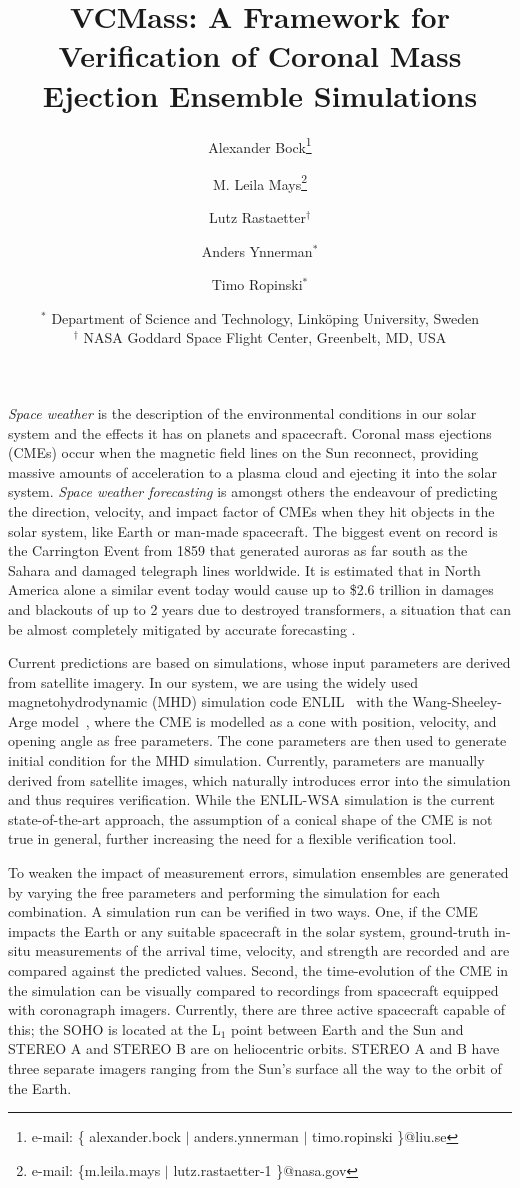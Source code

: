 \documentclass{vgtc}                          %
\title{VCMass: A Framework for Verification of Coronal Mass Ejection Ensemble Simulations}
\author{
Alexander Bock\thanks{e-mail: \{ alexander.bock $\vert$ anders.ynnerman $\vert$ timo.ropinski \}@liu.se}
\and M. Leila Mays\thanks{e-mail: \{m.leila.mays $\vert$ lutz.rastaetter-1 \}@nasa.gov}
\and Lutz Rastaetter$^\dagger$
\and Anders Ynnerman$^*$
\and Timo Ropinski$^*$\\
\and
\scriptsize $^*$ Department of Science and Technology, Link\"oping University, Sweden\\%
\scriptsize $^\dagger$ NASA Goddard Space Flight Center, Greenbelt, MD, USA
}
\begin{document}
\maketitle

\emph{Space weather} is the description of the environmental conditions in our solar system and the effects it has on planets and spacecraft. Coronal mass ejections (CMEs) occur when the magnetic field lines on the Sun reconnect, providing massive amounts of acceleration to a plasma cloud and ejecting it into the solar system. \emph{Space weather forecasting} is amongst others the endeavour of predicting the direction, velocity, and impact factor of CMEs when they hit objects in the solar system, like Earth or man-made spacecraft. The biggest event on record is the Carrington Event from 1859 that generated auroras as far south as the Sahara and damaged telegraph lines worldwide. It is estimated that in North America alone a similar event today would cause up to \$2.6 trillion in damages and blackouts of up to 2 years due to destroyed transformers, a situation that can be almost completely mitigated by accurate forecasting \cite{lloyds2013impact}.

Current predictions are based on simulations, whose input parameters are derived from satellite imagery. In our system, we are using the widely used magnetohydrodynamic (MHD) simulation code ENLIL~\cite{odstrcil2003modeling} with the Wang-Sheeley-Arge model~\cite{parsons2011wang}, where the CME is modelled as a cone with position, velocity, and opening angle as free parameters. The cone parameters are then used to generate initial condition for the MHD simulation. Currently, parameters are manually derived from satellite images, which naturally introduces error into the simulation and thus requires verification. While the ENLIL-WSA simulation is the current state-of-the-art approach, the assumption of a conical shape of the CME is not true in general, further increasing the need for a flexible verification tool.

To weaken the impact of measurement errors, simulation ensembles are generated by varying the free parameters and performing the simulation for each combination. A simulation run can be verified in two ways. One, if the CME impacts the Earth or any suitable spacecraft in the solar system, ground-truth in-situ measurements of the arrival time, velocity, and strength are recorded and are compared against the predicted values. Second, the time-evolution of the CME in the simulation can be visually compared to recordings from spacecraft equipped with coronagraph imagers. Currently, there are three active spacecraft capable of this; the SOHO is located at the L$_1$ point between Earth and the Sun and STEREO A and STEREO B are on heliocentric orbits. STEREO A and B have three separate imagers ranging from the Sun's surface all the way to the orbit of the Earth.
\end{document}
